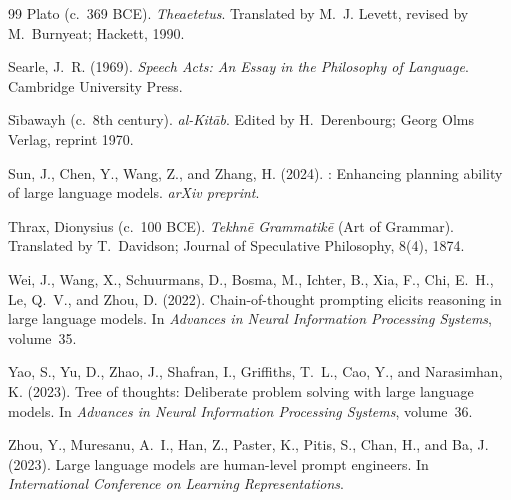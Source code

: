 \documentclass[11pt,a4paper]{article}
\begin{document}
\begin{thebibliography}{99}
Plato (c.~369 BCE).
\newblock \emph{Theaetetus}.
\newblock Translated by M.~J. Levett, revised by M.~Burnyeat; Hackett, 1990.

Searle, J.~R. (1969).
\newblock \emph{Speech Acts: An Essay in the Philosophy of Language}.
\newblock Cambridge University Press.

S\={\i}bawayh (c.~8th century).
\newblock \emph{al-Kit\=ab}.
\newblock Edited by H.~Derenbourg; Georg Olms Verlag, reprint 1970.

Sun, J., Chen, Y., Wang, Z., and Zhang, H. (2024).
: Enhancing planning ability of large language models.
\newblock \emph{arXiv preprint}.

Thrax, Dionysius (c.~100 BCE).
\newblock \emph{Tekhn\=e Grammatik\=e} (Art of Grammar).
\newblock Translated by T.~Davidson; Journal of Speculative Philosophy, 8(4), 1874.

Wei, J., Wang, X., Schuurmans, D., Bosma, M., Ichter, B., Xia, F., Chi, E.~H., Le, Q.~V., and Zhou, D. (2022).
\newblock Chain-of-thought prompting elicits reasoning in large language models.
\newblock In \emph{Advances in Neural Information Processing Systems}, volume~35.

Yao, S., Yu, D., Zhao, J., Shafran, I., Griffiths, T.~L., Cao, Y., and Narasimhan, K. (2023).
\newblock Tree of thoughts: Deliberate problem solving with large language models.
\newblock In \emph{Advances in Neural Information Processing Systems}, volume~36.

Zhou, Y., Muresanu, A.~I., Han, Z., Paster, K., Pitis, S., Chan, H., and Ba, J. (2023).
\newblock Large language models are human-level prompt engineers.
\newblock In \emph{International Conference on Learning Representations}.

\end{thebibliography}
\end{document}
